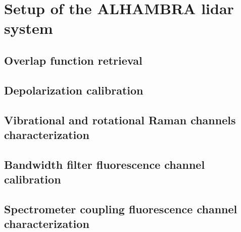 \chapter{Setup of the ALHAMBRA lidar system}
\label{sect::devs01_chapter2}

\section{Overlap function retrieval}
\label{sect::devs01_chapter2_overlap}

\section{Depolarization calibration}
\label{sect::devs01_chapter2_depolarization}

\section{Vibrational and rotational Raman channels characterization}
\label{sect::devs01_chapter2_raman}

\section{Bandwidth filter fluorescence channel calibration}
\label{sect::devs01_chapter2_bandwidth}

\section{Spectrometer coupling fluorescence channel characterization}
\label{sect::devs01_chapter2_spectrometer}